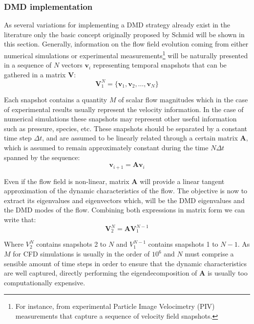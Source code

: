 \subsubsection{DMD implementation}

As several variations for implementing a DMD strategy already exist in the literature only the basic concept originally proposed by Schmid \cite{schmid2010dynamic} will be shown in this section. Generally, information on the flow field evolution coming from either numerical simulations or experimental measurements\footnote{For instance, from experimental Particle Image Velocimetry (PIV) measurements that capture a sequence of velocity field snapshots.} will be naturally presented in a sequence of $N$ vectors $\mathbf v_i$ representing temporal snapshots that can be gathered in a matrix $\mathbf V$:
\begin{equation}\label{eq:dmd_snaps}
	\mathbf V_1^N = \{\mathbf v_1, \mathbf v_2, \dots, \mathbf v_N\}
\end{equation}

Each snapshot contains a quantity $M$ of scalar flow magnitudes which in the case of experimental results usually represent the velocity information. In the case of numerical simulations these snapshots may represent other useful information such as pressure, species, etc. These snapshots should be separated by a constant time step $\Delta t$, and are assumed to be linearly related through a certain matrix $\mathbf A$, which is assumed to remain approximately constant during the time $N\Delta t$ spanned by the sequence:
\begin{equation}\label{eq:dmd_linear}
	\mathbf v_{i+1} = \mathbf A \mathbf v_i
\end{equation}

Even if the flow field is non-linear, matrix $\mathbf A$ will provide a linear tangent approximation of the dynamic characteristics of the flow. The objective is now to extract its eigenvalues and eigenvectors which, will be the DMD eigenvalues and the DMD modes of the flow. Combining both expressions in matrix form we can write that:
\begin{equation}\label{eq:dmd_mat}
	 \mathbf V_{2}^{N}=\mathbf A \mathbf V_{1}^{N-1}
\end{equation}

Where $V_{2}^{N}$ contains snapshots 2 to $N$ and $V_{1}^{N-1}$ contains snapshots 1 to $N-1$. As $M$ for CFD simulations is usually in the order of $10^6$ and $N$ must comprise a sensible amount of time steps in order to ensure that the dynamic characteristics are well captured, directly performing the eigendecomposition of $\mathbf A$ is usually too computationally expensive.


